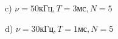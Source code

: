 \documentclass[a4paper,12pt]{article} %
\begin{document}
\begin{figure}[h!]
\begin{minipage}[h!]{0.47\linewidth}
 c) $\nu = 50 кГц, T = 3 мс, N = 5$ \\
\end{minipage}
\hfill
\begin{minipage}[h!]{0.47\linewidth}
 d) $\nu = 30 кГц, T = 1 мс, N = 5$ \\
\end{minipage}
\vfill
\begin{minipage}[h!]{0.47\linewidth}

\end{minipage}
\end{figure}
\end{document}
